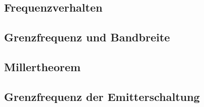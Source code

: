 \documentclass[a4paper, 12pt]{article}
\begin{document}
\subsection{Frequenzverhalten}


\subsection{Grenzfrequenz und Bandbreite}


\subsection{Millertheorem}


\subsection{Grenzfrequenz der Emitterschaltung}

\end{document}
